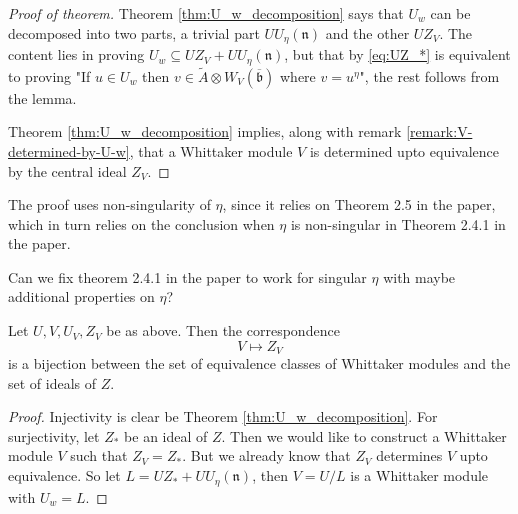 \documentclass{article}
\theoremstyle{mytheoremstyle}
\theoremstyle{mytheoremstyle}
\theoremstyle{myproblemstyle}
\begin{document}
    \begin{proof}[Proof of theorem]
    	Theorem \ref{thm:U_w_decomposition} says that $U_w$ can be decomposed into two parts, a trivial 
	part $UU_\eta(\mathfrak n)$ and the other $UZ_V$. The content lies in proving 
	$U_w \subseteq UZ_V + UU_\eta(\mathfrak n)$, but that by \eqref{eq:UZ_*} is equivalent to proving 
	"If $u\in U_w$ then $v \in \tilde A \otimes W_V(\overline{\mathfrak b})$ where $v = u^\eta$", the rest 
	follows from the lemma.

	Theorem \ref{thm:U_w_decomposition} implies, along with remark \ref{remark:V-determined-by-U-w},
	  that a Whittaker module $V$ is determined upto equivalence 
	by the central ideal $Z_V$.
    \end{proof}

  \begin{remark}
    The proof uses non-singularity of $\eta$, since it relies on Theorem 2.5 in the paper, which in turn relies on 
    the conclusion when $\eta$ is non-singular in Theorem 2.4.1 in the paper.

    Can we fix theorem 2.4.1 in the paper to work for singular $\eta$ with maybe additional properties on $\eta$?
  \end{remark}
    

    \begin{theorem}
      Let $U, V, U_V, Z_V$ be as above. Then the correspondence 
      \begin{equation}
      	V \mapsto Z_V
      	\label{eq:correspondence}
      \end{equation}
      is a bijection between the set of equivalence classes of Whittaker modules and the set of ideals of $Z$.
    \end{theorem}
    
    \begin{proof}[Proof]
    	Injectivity is clear be Theorem \ref{thm:U_w_decomposition}. 
	For surjectivity, let $Z_*$ be an ideal of $Z$.
	Then we would like to construct a Whittaker module $V$ such that $Z_V = Z_*$. 
	But we already know that $Z_V$ determines $V$ upto equivalence. 
	So let $L = UZ_* + UU_\eta(\mathfrak n)$, then $V = U/L$ is a Whittaker module with $U_w = L$.
    \end{proof}
\end{document}
